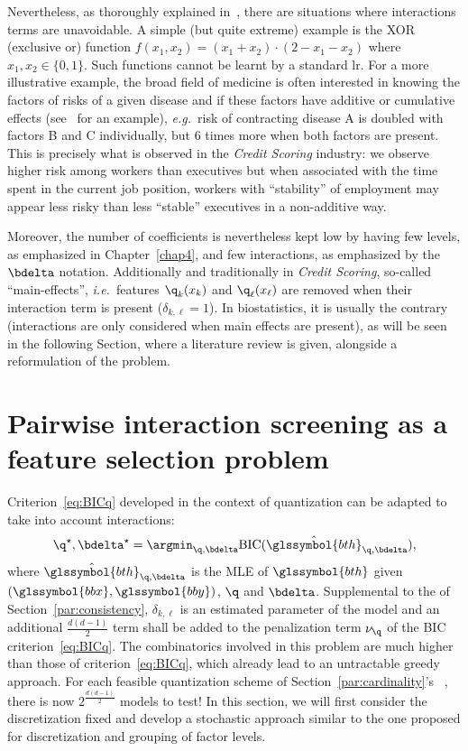 Nevertheless, as thoroughly explained in~\cite{berry2010testing}, there are situations where interactions terms are unavoidable. A simple (but quite extreme) example is the XOR (exclusive or) function $f(x_1,x_2) = (x_1 + x_2)\cdot(2 - x_1 - x_2)$ where $x_1,x_2 \in \{0,1\}$. Such functions cannot be learnt by a standard \gls{lr}. For a more illustrative example, the broad field of medicine is often interested in knowing the factors of risks of a given disease and if these factors have additive or cumulative effects (see~\cite{morgan2014adversity} for an example), \textit{e.g.}\ risk of contracting disease A is doubled with factors B and C individually, but 6 times more when both factors are present. This is precisely what is observed in the \textit{Credit Scoring} industry: we observe higher risk among workers than executives but when associated with the time spent in the current job position, workers with ``stability'' of employment may appear less risky than less ``stable'' executives in a non-additive way.

Moreover, the number of coefficients is nevertheless kept low by having few levels, as emphasized in Chapter~\ref{chap4}, and few interactions, as emphasized by the $\bdelta$ notation. Additionally and traditionally in \textit{Credit Scoring}, so-called ``main-effects'', \textit{i.e.}\ features $\q_k(x_k)$ and $\q_\ell(x_\ell)$ are removed when their interaction term is present ($\delta_{k,\ell} = 1$). In biostatistics, it is usually the contrary (interactions are only considered when main effects are present), as will be seen in the following Section, where a literature review is given, alongside a reformulation of the problem.


\section{Pairwise interaction screening as a feature selection problem} \label{sec:pairwise}

Criterion~\eqref{eq:BICq} developed in the context of quantization can be adapted to take into account interactions:
\begin{equation} \label{eq:criterion_inter}
\q^\star,\bdelta^\star = \argmin_{\q,\bdelta} \text{BIC}(\hat{\glssymbol{bth}}_{\q,\bdelta}),
\end{equation}
where $\hat{\glssymbol{bth}}_{\q,\bdelta}$ is the MLE of $\glssymbol{bth}$ given $(\glssymbol{bbx},\glssymbol{bby})$, $\q$ and $\bdelta$. Supplemental to the  of Section~\ref{par:consistency}, $\delta_{k,\ell}$ is an estimated parameter of the model and an additional $\frac{d(d-1)}{2}$ term shall be added to the penalization term $\nu_\q$ of the BIC criterion~\eqref{eq:BICq}. The combinatorics involved in this problem are much higher than those of criterion~\eqref{eq:BICq}, which already lead to an untractable greedy approach. For each feasible quantization scheme of Section~\ref{par:cardinality}'s ~, there is now $2^{\frac{d(d-1)}{2}}$ models to test! In this section, we will first consider the discretization fixed and develop a stochastic approach similar to the one proposed for discretization and grouping of factor levels.

